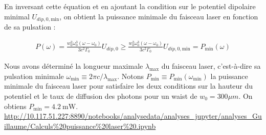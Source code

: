 En inversant cette équation et en ajoutant la condition sur le potentiel dipolaire minimal $U_{dip,0,\text{min}}$, on obtient la puissance minimale du faisceau laser en fonction de sa pulsation :

\begin{eqnarray}
	P(\omega) = \frac{w_0^2 \omega_0^3 (\omega - \omega_0)}{3c^2 \Gamma_0} U_{dip,0} \geq \frac{w_0^2 \omega_0^3 (\omega - \omega_0)}{3c^2 \Gamma_0} U_{dip,0,\text{min}} = P_{\text{min}}(\omega)
\end{eqnarray}

Nous avons déterminé la longueur maximale $\lambda_{\text{max}}$ du faisceau laser, c'est-à-dire sa pulsation minimale $\omega_{\text{min}} \equiv 2\pi c/\lambda_{\text{max}}$. Notons $P_{\text{min}} \equiv P_{\text{min}}(\omega_{\text{min}})$ la puissance minimale du faisceau laser pour satisfaire les deux conditions sur la hauteur du potentiel et le taux de diffusion des photons pour un waist de $w_0 = 300\mu m $. On obtiens { $P_{\text{min}} = 4.2~\text{mW}$}.\\



\url{http://10.117.51.227:8890/notebooks/analysedata/analyses_jupyter/analyses_Guillaume/Calculs%20puissance%20laser%20.ipynb}\\

